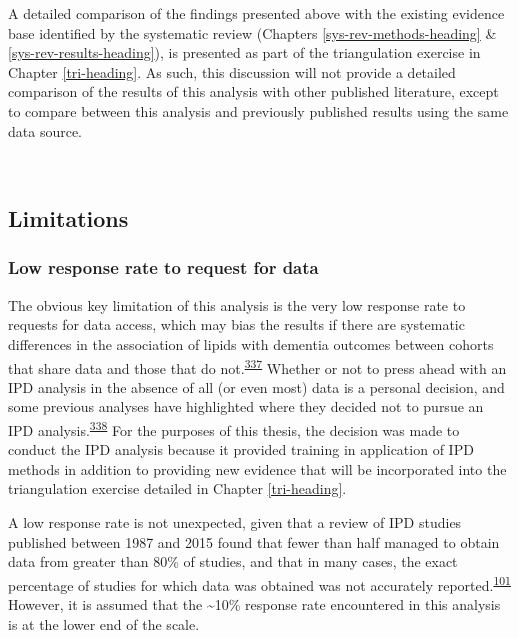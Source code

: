 \documentclass[a4paper, twoside]{templates/ociamthesis}
\begin{document}
A detailed comparison of the findings presented above with the existing evidence base identified by the systematic review (Chapters \ref{sys-rev-methods-heading} \& \ref{sys-rev-results-heading}), is presented as part of the triangulation exercise in Chapter \ref{tri-heading}. As such, this discussion will not provide a detailed comparison of the results of this analysis with other published literature, except to compare between this analysis and previously published results using the same data source.

~

\hypertarget{limitations-1}{%
\subsection{Limitations}\label{limitations-1}}

\hypertarget{low-response-rate-to-request-for-data}{%
\subsubsection{Low response rate to request for data}\label{low-response-rate-to-request-for-data}}

The obvious key limitation of this analysis is the very low response rate to requests for data access, which may bias the results if there are systematic differences in the association of lipids with dementia outcomes between cohorts that share data and those that do not.\textsuperscript{\protect\hyperlink{ref-ahmed2012}{337}} Whether or not to press ahead with an IPD analysis in the absence of all (or even most) data is a personal decision, and some previous analyses have highlighted where they decided not to pursue an IPD analysis.\textsuperscript{\protect\hyperlink{ref-jaspers2014}{338}} For the purposes of this thesis, the decision was made to conduct the IPD analysis because it provided training in application of IPD methods in addition to providing new evidence that will be incorporated into the triangulation exercise detailed in Chapter \ref{tri-heading}.

A low response rate is not unexpected, given that a review of IPD studies published between 1987 and 2015 found that fewer than half managed to obtain data from greater than 80\% of studies, and that in many cases, the exact percentage of studies for which data was obtained was not accurately reported.\textsuperscript{\protect\hyperlink{ref-nevitt2017}{101}} However, it is assumed that the \textasciitilde10\% response rate encountered in this analysis is at the lower end of the scale.
\end{document}
